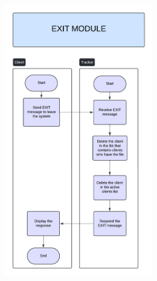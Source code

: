 \documentclass[a4paper]{article}
\begin{document}
\includegraphics[width=0.5\textwidth]{exit_module.png} 
\end{document}
